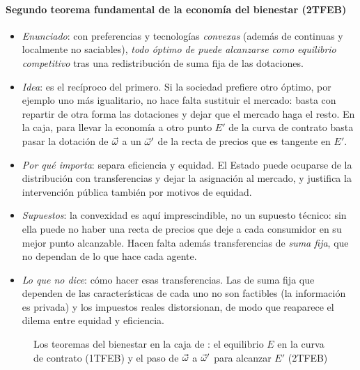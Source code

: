 \documentclass[11pt]{article}
\begin{document}
\paragraph{Segundo teorema fundamental de la economía del bienestar (2TFEB)}

\begin{itemize}
\item \emph{Enunciado}: con preferencias y tecnologías \emph{convexas} (además de continuas y localmente no saciables), \emph{todo óptimo de  puede alcanzarse como equilibrio competitivo} tras una redistribución de suma fija de las dotaciones.
\item \emph{Idea}: es el recíproco del primero. Si la sociedad prefiere otro óptimo, por ejemplo uno más igualitario, no hace falta sustituir el mercado: basta con repartir de otra forma las dotaciones y dejar que el mercado haga el resto. En la caja, para llevar la economía a otro punto $E'$ de la curva de contrato basta pasar la dotación de $\vec{\omega}$ a un $\vec{\omega}'$ de la recta de precios que es tangente en $E'$.
\item \emph{Por qué importa}: separa eficiencia y equidad. El Estado puede ocuparse de la distribución con transferencias y dejar la asignación al mercado, y justifica la intervención pública también por motivos de equidad.
\item \emph{Supuestos}: la convexidad es aquí imprescindible, no un supuesto técnico: sin ella puede no haber una recta de precios que deje a cada consumidor en su mejor punto alcanzable. Hacen falta además transferencias de \emph{suma fija}, que no dependan de lo que hace cada agente.
\item \emph{Lo que no dice}: cómo hacer esas transferencias. Las de suma fija que dependen de las características de cada uno no son factibles (la información es privada) y los impuestos reales distorsionan, de modo que reaparece el dilema entre equidad y eficiencia.
\end{itemize}

\begin{figure}[H]
\centering
\caption{Los teoremas del bienestar en la caja de : el equilibrio $E$ en la curva de contrato (1TFEB) y el paso de $\vec{\omega}$ a $\vec{\omega}'$ para alcanzar $E'$ (2TFEB)}\label{fig:caja-intercambio-teoremas}
\end{figure}
\end{document}
